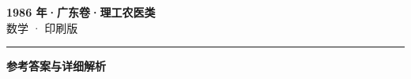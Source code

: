 \documentclass[zihao=5, a4paper]{ctexart}
\begin{document}
\begin{center}
  {\Large\bfseries 1986 年·广东卷·理工农医类}\\[4pt]
  {\large 数学 · 印刷版}
\end{center}
\medskip
{}

\par\bigskip\hrule\bigskip
{}
\begin{center}{\large\bfseries 参考答案与详细解析}\end{center}
\smallskip

\end{document}
